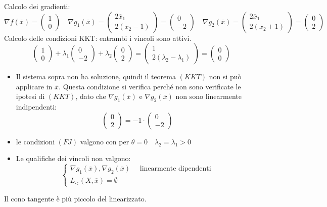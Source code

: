 \begin{example}
Calcolo dei gradienti:
$$
\nabla f(\overline{x}) =
\begin{pmatrix}
1 \\
0
\end{pmatrix}
\quad
\nabla g_1(\overline{x}) =
\begin{pmatrix}
2 \overline{x}_1 \\
2(\overline{x}_2 -1)
\end{pmatrix}
=
\begin{pmatrix}
0 \\
-2
\end{pmatrix}
\quad
\nabla g_2(\overline{x}) =
\begin{pmatrix}
2 \overline{x}_1 \\
2(\overline{x}_2 + 1)
\end{pmatrix}
=
\begin{pmatrix}
0 \\
2
\end{pmatrix}
$$
Calcolo delle condizioni KKT: entrambi i vincoli sono attivi.
$$
\begin{pmatrix}
1 \\
0
\end{pmatrix}
+
\lambda_1
\begin{pmatrix}
0 \\
-2
\end{pmatrix}
+ \lambda_2
\begin{pmatrix}
0 \\
2
\end{pmatrix}
=
\begin{pmatrix}
1 \\
2(\lambda_2 - \lambda_1)
\end{pmatrix} =
\begin{pmatrix}
0 \\
0
\end{pmatrix}
$$
\begin{itemize}
\item Il sistema sopra non ha soluzione, quindi il teorema $(KKT)$ non si può applicare in $\overline{x}$. Questa condizione si verifica perché non sono verificate le ipotesi di $(KKT)$, dato che $\nabla g_1(\overline{x})$ e $\nabla g_2(\overline{x})$ non sono linearmente indipendenti:
$$
\begin{pmatrix}0 \\2 \end{pmatrix}
=
-1 \cdot
\begin{pmatrix}0 \\-2\end{pmatrix}
$$

\item le condizioni $(FJ)$ valgono con  per 
$\theta = 0 \quad \lambda_2 = \lambda_1 > 0$
\item Le qualifiche dei vincoli non valgono:
$$
\left\{
  \begin{array}{l}
  \nabla g_1(\overline{x}), \nabla g_2 (\overline{x}) \quad \text{ linearmente dipendenti} \\
L_{<}(X, \overline{x}) = \emptyset  
  \end{array}
\right.
$$
\end{itemize}
Il cono tangente \`e pi\`u piccolo del linearizzato.
\end{example}

